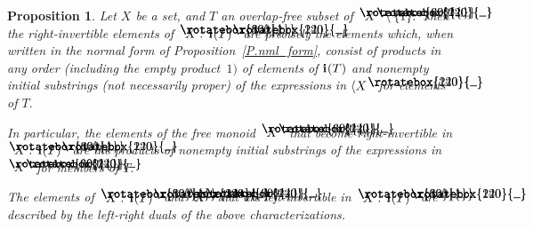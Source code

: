 \documentclass{amsart}
\newtheorem{proposition}[equation]{Proposition}
\numberwithin{equation}{section}
\newcommand{\I}{\mathbf{i}\hspace{.05em}}
\newcommand{\langl}{\begin{picture}(.51em,1em)
\put(.11em,.33em){\rotatebox{60}{\line(1,0){.55em}}}
\put(.11em,.33em){\rotatebox{300}{\line(1,0){.55em}}}
\end{picture}}
\newcommand{\rangl}{\begin{picture}(.5em,1em)
\put(.09em,.33em){\rotatebox{120}{\line(1,0){.55em}}}
\put(.09em,.33em){\rotatebox{240}{\line(1,0){.55em}}}
\end{picture}}
\begin{document}
\begin{proposition}\label{P.rt-or-left-inv}
Let $X$ be a set, and $T$ an overlap-free subset
of $\langl X\rangl\setminus\{1\}.$
Then the right-invertible
elements of $\langl X:\,\I(T)\rangl$ are precisely the elements
which, when written in the normal form
of Proposition~\ref{P.nml_form}, consist of products
in any order {\rm(}including the empty product~$1)$
of elements of $\I(T)$ and nonempty {\em initial} substrings
{\rm(}not necessarily proper{\rm)} of the expressions
in $\langle X\rangl$ for elements of $T.$

In particular, the elements
of the free monoid $\langl X\rangl$ that become right-invertible in
$\langl X:\,\I(T)\rangl$ are the products of
nonempty initial substrings of the expressions
in $\langl X\rangl$ for members of $T.$

The elements of $\langl X:\,\I(T)\rangl$ and $\langl X\rangl$ that
are {\em left}-invertible in $\langl X:\,\I(T)\rangl$
are described by the left-right duals of the above characterizations.
\end{proposition}
\end{document}
